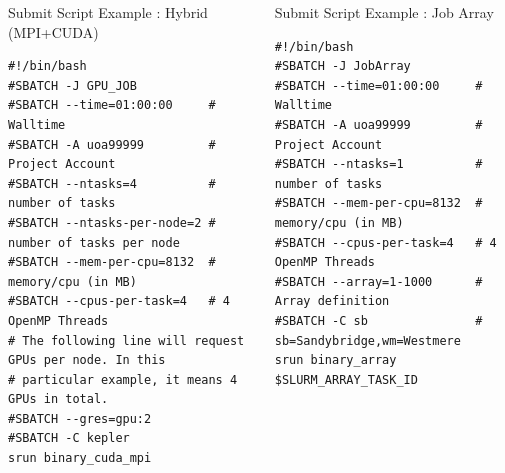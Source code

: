 \documentclass[final,t]{beamer}
\begin{document}
\begin{frame}[fragile]{}
\begin{columns}[t]
\begin{column}{.3\linewidth}
      \begin{block}{Submit Script Example : Hybrid (MPI+CUDA)}
              \vspace*{-3ex}
        \begin{verbatim}
#!/bin/bash
#SBATCH -J GPU_JOB
#SBATCH --time=01:00:00     # Walltime
#SBATCH -A uoa99999         # Project Account
#SBATCH --ntasks=4          # number of tasks
#SBATCH --ntasks-per-node=2 # number of tasks per node
#SBATCH --mem-per-cpu=8132  # memory/cpu (in MB)
#SBATCH --cpus-per-task=4   # 4 OpenMP Threads
# The following line will request GPUs per node. In this  
# particular example, it means 4 GPUs in total.
#SBATCH --gres=gpu:2       
#SBATCH -C kepler
srun binary_cuda_mpi
        \end{verbatim}
                \vspace*{-4ex}
      \end{block}


    \end{column}

    
    \begin{column}{.35\linewidth}
    
      \begin{block}{Submit Script Example : Job Array}
              \vspace*{-3ex}
        \begin{verbatim}
#!/bin/bash
#SBATCH -J JobArray
#SBATCH --time=01:00:00     # Walltime
#SBATCH -A uoa99999         # Project Account
#SBATCH --ntasks=1          # number of tasks
#SBATCH --mem-per-cpu=8132  # memory/cpu (in MB)
#SBATCH --cpus-per-task=4   # 4 OpenMP Threads
#SBATCH --array=1-1000      # Array definition
#SBATCH -C sb               # sb=Sandybridge,wm=Westmere
srun binary_array $SLURM_ARRAY_TASK_ID
        \end{verbatim}
                \vspace*{-4ex}
      \end{block}



\end{column}
\end{columns}
\end{frame}
\end{document}
